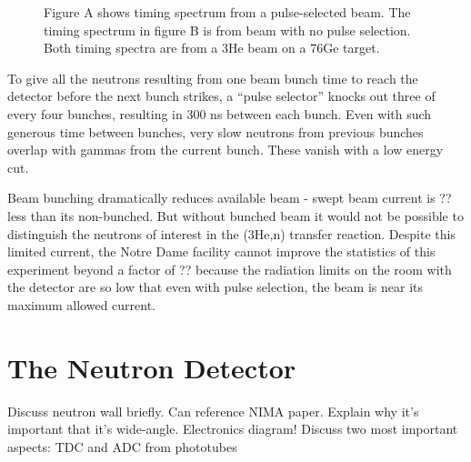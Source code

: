 \begin{figure}[htp]
\centering
{}
\label{fig:PSvsNPS_TOF}
\caption{Figure A shows timing spectrum from a pulse-selected beam.  The timing spectrum in figure B is from beam with no pulse selection.  Both timing spectra are from a 3He beam on a 76Ge target.}
\end{figure}

To give all the neutrons resulting from one beam bunch time to reach the detector before the next bunch strikes, a ``pulse selector'' knocks out three of every four bunches, resulting in 300 ns between each bunch.  Even with such generous time between bunches, very slow neutrons from previous bunches overlap with gammas from the current bunch.  These vanish with a low energy cut.


Beam bunching dramatically reduces available beam - swept beam current is ?? less than its non-bunched.  But without bunched beam it would not be possible to distinguish the neutrons of interest in the (3He,n) transfer reaction.  Despite this limited current, the Notre Dame facility cannot improve the statistics of this experiment beyond a factor of ?? because the radiation limits on the room with the detector are so low that even with pulse selection, the beam is near its maximum allowed current.


\section{The Neutron Detector}
Discuss neutron wall briefly.  Can reference NIMA paper. Explain why it's important that it's wide-angle. 
Electronics diagram!  Discuss two most important aspects: TDC and ADC from phototubes

